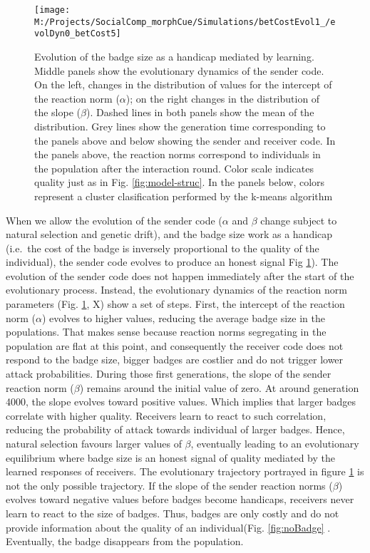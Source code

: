 \documentclass[
  12pt,
]{article}
\begin{document}
\begin{figure}

{\centering \texttt{[image: M:/Projects/SocialComp\_morphCue/Simulations/betCostEvol1\_/evolDyn0\_betCost5]} 

}

\caption{Evolution of the badge size as a handicap mediated by learning. Middle panels show the evolutionary dynamics of the sender code. On the left, changes in the distribution of values for the intercept of the reaction norm ($\alpha$); on the right changes in the distribution of the slope ($\beta$). Dashed lines in both panels show the mean of the distribution. Grey lines show the generation time corresponding to the panels above and below showing the sender and receiver code. In the panels above, the reaction norms correspond to individuals in the population after the interaction round. Color scale indicates quality just as in Fig. \ref{fig:model-struc}. In the panels below, colors represent a cluster clasification performed by the k-means algorithm}\label{fig:handicap}
\end{figure}

When we allow the evolution of the sender code (\(\alpha\) and \(\beta\)
change subject to natural selection and genetic drift), and the badge
size work as a handicap (i.e.~the cost of the badge is inversely
proportional to the quality of the individual), the sender code evolves
to produce an honest signal Fig \ref{fig:handicap}). The evolution of
the sender code does not happen immediately after the start of the
evolutionary process. Instead, the evolutionary dynamics of the reaction
norm parameters (Fig. \ref{fig:handicap}, X) show a set of steps. First,
the intercept of the reaction norm (\(\alpha\)) evolves to higher
values, reducing the average badge size in the populations. That makes
sense because reaction norms segregating in the population are flat at
this point, and consequently the receiver code does not respond to the
badge size, bigger badges are costlier and do not trigger lower attack
probabilities. During those first generations, the slope of the sender
reaction norm (\(\beta\)) remains around the initial value of zero. At
around generation 4000, the slope evolves toward positive values. Which
implies that larger badges correlate with higher quality. Receivers
learn to react to such correlation, reducing the probability of attack
towards individual of larger badges. Hence, natural selection favours
larger values of \(\beta\), eventually leading to an evolutionary
equilibrium where badge size is an honest signal of quality mediated by
the learned responses of receivers. The evolutionary trajectory
portrayed in figure \ref{fig:handicap} is not the only possible
trajectory. If the slope of the sender reaction norms (\(\beta\))
evolves toward negative values before badges become handicaps, receivers
never learn to react to the size of badges. Thus, badges are only costly
and do not provide information about the quality of an individual(Fig.
\ref{fig:noBadge} . Eventually, the badge disappears from the
population.
\end{document}
